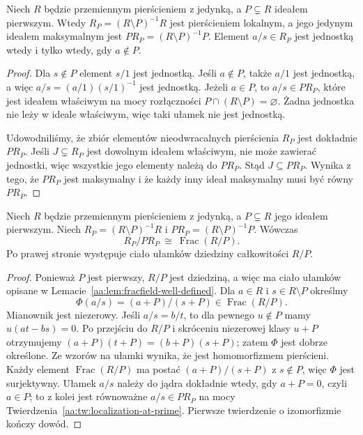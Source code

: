 \begin{twierdzenie}
\label{aa:tw:localization-at-prime}
Niech $R$ będzie przemiennym pierścieniem z jedynką,
a $P\subsetneq R$ ideałem pierwszym. Wtedy
$R_P=(R\setminus P)^{-1}R$ jest pierścieniem lokalnym,
a jego jedynym ideałem maksymalnym jest
$PR_P=(R\setminus P)^{-1}P$.
Element $a/s\in R_P$ jest jednostką wtedy i tylko wtedy,
gdy $a\notin P$.
\end{twierdzenie}
\begin{proof}
Dla $s\notin P$ element $s/1$ jest jednostką.
Jeśli $a\notin P$, także $a/1$ jest jednostką,
a więc $a/s=(a/1)(s/1)^{-1}$ jest jednostką.
Jeżeli $a\in P$, to $a/s\in PR_P$, które jest
ideałem właściwym na mocy rozłączności
$P\cap(R\setminus P)=\varnothing$.
Żadna jednostka nie leży w ideale właściwym,
więc taki ułamek nie jest jednostką.

Udowodniliśmy, że zbiór elementów nieodwracalnych
pierścienia $R_P$ jest dokładnie $PR_P$.
Jeśli $J\subsetneq R_P$ jest dowolnym ideałem właściwym,
nie może zawierać jednostki, więc wszystkie jego
elementy należą do $PR_P$. Stąd $J\subseteq PR_P$.
Wynika z tego, że $PR_P$ jest maksymalny i że każdy
inny ideał maksymalny musi być równy $PR_P$.
\end{proof}

\begin{twierdzenie}
\label{aa:tw:localization-residue-field}
Niech $R$ będzie przemiennym pierścieniem z jedynką,
a $P\subsetneq R$ jego ideałem pierwszym. Niech
$R_P=(R\setminus P)^{-1}R$ i $PR_P=(R\setminus P)^{-1}P$.
Wówczas
\[
 R_P/PR_P\ \cong\ \operatorname{Frac}(R/P).
\]
Po prawej stronie występuje ciało ułamków dziedziny
całkowitości $R/P$.
\end{twierdzenie}
\begin{proof}
Ponieważ $P$ jest pierwszy, $R/P$ jest dziedziną,
a więc ma ciało ułamków opisane w
Lemacie~\ref{aa:lem:fracfield-well-defined}.
Dla $a\in R$ i $s\in R\setminus P$ określmy
\[
 \Phi(a/s)=(a+P)/(s+P)\in\operatorname{Frac}(R/P).
\]
Mianownik jest niezerowy. Jeśli $a/s=b/t$,
to dla pewnego $u\notin P$ mamy $u(at-bs)=0$.
Po przejściu do $R/P$ i skróceniu niezerowej klasy
$u+P$ otrzymujemy $(a+P)(t+P)=(b+P)(s+P)$;
zatem $\Phi$ jest dobrze określone. Ze wzorów na
ułamki wynika, że jest homomorfizmem pierścieni.
Każdy element $\operatorname{Frac}(R/P)$ ma postać
$(a+P)/(s+P)$ z $s\notin P$, więc $\Phi$ jest
surjektywny. Ułamek $a/s$ należy do jądra dokładnie
wtedy, gdy $a+P=0$, czyli $a\in P$; to z kolei
jest równoważne $a/s\in PR_P$ na mocy
Twierdzenia~\ref{aa:tw:localization-at-prime}.
Pierwsze twierdzenie o izomorfizmie kończy dowód.
\end{proof}

